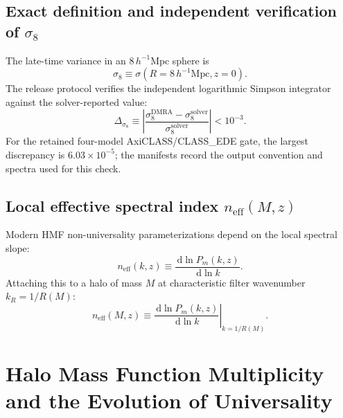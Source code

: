 \documentclass[11pt]{article}
\newcommand{\dd}{\,\mathrm d}
\newcommand{\Mpc}{\mathrm{Mpc}}
\begin{document}
\subsection{Exact definition and independent verification of \texorpdfstring{$\sigma_8$}{sigma8}}
The late-time variance in an $8\,h^{-1}\Mpc$ sphere is
\begin{equation}
\boxed{\sigma_8 \equiv \sigma(R = 8\,h^{-1}\Mpc, z=0)}.
\end{equation}
The release protocol verifies the independent logarithmic Simpson integrator against the solver-reported value:
\begin{equation}
\Delta_{\sigma_8} \equiv \left| \frac{\sigma_8^{\mathrm{DMRA}} - \sigma_8^{\mathrm{solver}}}{\sigma_8^{\mathrm{solver}}} \right| < 10^{-3}.
\end{equation}
For the retained four-model AxiCLASS/CLASS\_EDE gate, the largest discrepancy is $6.03\times10^{-5}$; the manifests record the output convention and spectra used for this check.

\subsection{Local effective spectral index \texorpdfstring{$n_{\mathrm{eff}}(M,z)$}{neff(M,z)}}
Modern HMF non-universality parameterizations depend on the local spectral slope:
\begin{equation}
\boxed{n_{\mathrm{eff}}(k, z) \equiv \frac{\dd\ln P_m(k, z)}{\dd\ln k}}.
\end{equation}
Attaching this to a halo of mass $M$ at characteristic filter wavenumber $k_R = 1/R(M)$:
\begin{equation}
\boxed{n_{\mathrm{eff}}(M, z) \equiv \left. \frac{\dd\ln P_m(k, z)}{\dd\ln k} \right|_{k = 1/R(M)}}.
\end{equation}

\section{Halo Mass Function Multiplicity and the Evolution of Universality}
\label{sec:hmf_universality}
\end{document}
